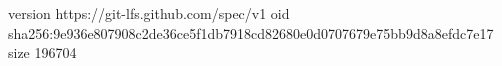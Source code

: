version https://git-lfs.github.com/spec/v1
oid sha256:9e936e807908c2de36ce5f1db7918cd82680e0d0707679e75bb9d8a8efdc7e17
size 196704
